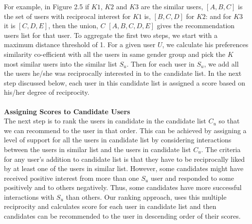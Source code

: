\documentclass[12pt,oneside]{book}
\begin{document}
For example, in Figure 2.5 if $K1$, $K2$ and $K3$ are the similar users, $[A, B, C]$ is the set of users with reciprocal interest for $K1$ is, $[B, C, D]$ for $K2$: and for $K3$ it is $[C, D, E]$, then the union, $C$ $[A, B, C, D, E]$ gives the recommendation users list for that user.
To aggregate the first two steps, we start with a maximum distance threshold of 1. For a
given user $U$,  we calculate his preferences similarity co-efficient with all the users in same gender group and pick the $K$ most similar users into the similar list $S_u$. Then for each user in $S_u$, we add all the users he/she was reciprocally interested in to the candidate list. In the next step discussed below, each user in this candidate list is assigned a score based on his/her degree of reciprocity.\\\\
\textbf{Assigning Scores to Candidate Users}\\
The next step is to rank the users in candidate in the candidate list $C_u$ so that we can recommend to the user in that order. This can be achieved by assigning a level of support for all the users in candidate list by considering interactions between the users in similar list and the users in candidate list $C_u$. The criteria for any user's addition to candidate list is that they have to be reciprocally liked by at least one of the users in similar list. However, some candidates might have received positive interest from more than one $S_u$ user and responded to some positively and to others negatively. Thus, some candidates have more successful interactions with $S_u$ than others. Our ranking approach, uses this multiple reciprocity and calculates score for each user in candidate list and then candidates can be recommended to the user in descending order of their scores. 
\end{document}
